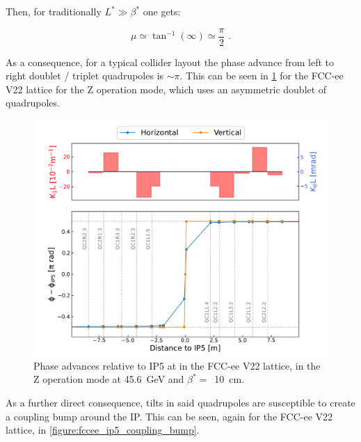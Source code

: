 Then, for traditionally \(L^* \gg \beta^{\ast}\) one gets:

\begin{equation}
    \mu \simeq \tan^{-1} \left( \infty \right) \simeq \frac{\pi}{2} \text{ .}
    \label{equation:collider_drift_space_phase_advance_approximation}
\end{equation}

As a consequence, for a typical collider layout the phase advance from left to right doublet / triplet quadrupoles is \(\sim \pi\).
This can be seen in \cref{figure:fccee_phases_to_ip5} for the FCC-ee~\cite{EPJST:Abada:FCCee_Lepton_Collider} V\num{22} lattice for the Z operation mode, which uses an asymmetric doublet of quadrupoles.

\begin{figure}[!htb]
    \centering
    \includegraphics*[width=\textwidth]{Figures/IR_Coupling_Correction/fccee_phases_to_ip5.pdf}
    \caption{Phase advances relative to IP\num{5} at in the FCC-ee V22 lattice, in the Z operation mode at \qty{45.6}{\giga\electronvolt} and \(\beta^{\ast}=\)~\qty{10}{\centi\meter}.}
    \label{figure:fccee_phases_to_ip5}
\end{figure}

As a further direct consequence, tilts in said quadrupoles are susceptible to create a coupling bump around the IP.
This can be seen, again for the FCC-ee V\num{22} lattice, in \cref{figure:fccee_ip5_coupling_bump}.

